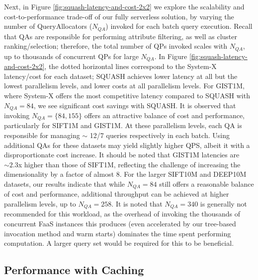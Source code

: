 Next, in Figure \ref{fig:squash-latency-and-cost-2x2} we explore the scalability and cost-to-performance trade-off of our fully serverless solution, by varying the number of QueryAllocators ($N_{QA}$) invoked for each batch query execution. 
Recall that QAs are responsible for performing attribute filtering, as well as cluster ranking/selection; therefore, the total number of QPs invoked scales with $N_{QA}$, up to thousands of concurrent QPs for large $N_{QA}$. 
In Figure \ref{fig:squash-latency-and-cost-2x2}, the dotted horizontal lines correspond to the System-X latency/cost for each dataset; SQUASH achieves lower latency at all but the lowest parallelism levels, and lower costs at all parallelism levels. 
For GIST1M, where System-X offers the most competitive latency compared to SQUASH with $N_{QA}=84$, we see significant cost savings with SQUASH.
It is observed that invoking $N_{QA} = \{84, 155\}$ offers an attractive balance of cost and performance, particularly for SIFT1M and GIST1M. 
At these parallelism levels, each QA is responsible for managing $\sim$ 12/7 queries respectively in each batch. 
Using additional QAs for these datasets may yield slightly higher QPS, albeit it with a disproportionate cost increase.
It should be noted that GIST1M latencies are $\sim 2.3$x higher than those of SIFT1M, reflecting the challenge of increasing the dimensionality by a factor of almost 8.
For the larger SIFT10M and DEEP10M datasets, our results indicate that while $N_{QA}=84$ still offers a reasonable balance of cost and performance, additional throughput can be achieved at higher parallelism levels, up to $N_{QA}=258$. 
It is noted that $N_{QA}=340$ is generally not recommended for this workload, as the overhead of invoking the thousands of concurrent FaaS instances this produces (even accelerated by our tree-based invocation method and warm starts) dominates the time spent performing computation. A larger query set would be required for this to be beneficial.




\subsection{Performance with Caching}
\label{ss:7-caching}

